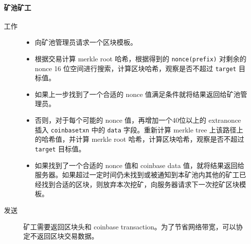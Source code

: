 \documentclass{sjtuarticle}
\begin{document}
\paragraph{矿池矿工}
\begin{description}
    \item[工作] \begin{itemize}
        \item 向矿池管理员请求一个区块模板。
        \item 根据交易计算 merkle root 哈希，根据得到的 \verb"nonce(prefix)" 对剩余的 nonce 16 位空间进行搜索，计算区块哈希，观察是否不超过 \verb"target" 目标值。
        \item 如果上一步找到了一个合适的 nonce 值满足条件就将结果返回给矿池管理员。
        \item 否则，对于每个可能的 nonce 值，再增加一个40位以上的 extranonce 插入 \verb"coinbasetxn" 中的 \verb"data" 字段。重新计算 merkle tree 上该路径上的哈希值，并计算 merkle root 哈希，计算区块哈希，观察是否不超过 \verb"target" 目标值。
        \item 如果找到了一个合适的 nonce 值和 coinbase data 值，就将结果返回给服务器。如果超过一定时间仍未找到或被通知到本矿池内其他的矿工已经找到合适的区块，则放弃本次挖矿，向服务器请求下一次挖矿区块模板。
    \end{itemize}
    \item[发送] 矿工需要返回区块头和 coinbase transaction。为了节省网络带宽，可以协定不返回区块交易数据。
\end{description}

\end{document}
